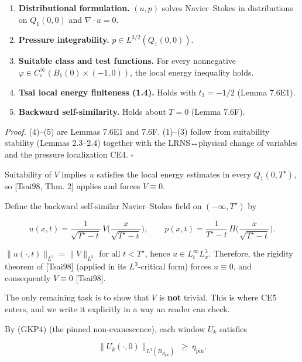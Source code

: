 \documentclass[
  11pt,
]{article}
\providecommand{\tightlist}{%
  \setlength{\itemsep}{0pt}\setlength{\parskip}{0pt}}
\begin{document}
\begin{enumerate}
\def\labelenumi{\arabic{enumi}.}
\tightlist
\item
  \textbf{Distributional formulation.} \((u,p)\) solves Navier--Stokes in distributions on \(Q_1(0,0)\) and \(\nabla\cdot u=0\).
\item
  \textbf{Pressure integrability.} \(p\in L^{3/2}(Q_1(0,0))\).
\item
  \textbf{Suitable class and test functions.} For every nonnegative \(\varphi\in C_c^\infty(B_1(0)\times(-1,0))\), the local energy inequality holds.
\item
  \textbf{Tsai local energy finiteness (1.4).} Holds with \(t_3=-1/2\) (Lemma 7.6E1).
\item
  \textbf{Backward self-similarity.} Holds about \(T=0\) (Lemma 7.6F).
\end{enumerate}

\emph{Proof.} (4)--(5) are Lemmas 7.6E1 and 7.6F. (1)--(3) follow from suitability stability (Lemmas 2.3--2.4) together with the LRNS↔physical change of variables and the pressure localization CE4. \(\square\)

Suitability of \(V\) implies \(u\) satisfies the local energy estimates in every \(Q_1(0,T^\star)\), so {[}Tsai98, Thm. 2{]} applies and forces \(V\equiv 0\).

Define the backward self-similar Navier--Stokes field on \((-\infty,T^\star)\) by

\begin{equation}
u(x,t)=\frac{1}{\sqrt{T^\star-t}}\,V\!\Big(\frac{x}{\sqrt{T^\star-t}}\Big),\qquad
p(x,t)=\frac{1}{T^\star-t}\,\Pi\!\Big(\frac{x}{\sqrt{T^\star-t}}\Big).
\tag{7.35}\label{eq:7_35_selfsimilar_from_V}
\end{equation}

\(\|u(\cdot,t)\|_{L^3}=\|V\|_{L^3}\) for all \(t<T^\star\), hence \(u\in L_t^\infty L_x^3\). Therefore, the rigidity theorem of {[}Tsai98{]} (applied in its \(L^3\)-critical form) forces \(u\equiv 0\), and consequently \(V\equiv 0\) {[}Tsai98{]}.

The only remaining task is to show that \(V\) is \textbf{not} trivial. This is where CE5 enters, and we write it explicitly in a way an reader can check.

By (GKP4) (the pinned non-evanescence), each window \(U_k\) satisfies

\begin{equation}
\|U_k(\cdot,0)\|_{L^3(B_{R_{\mathrm{pin}}})}\ \ge\ \eta_{\mathrm{pin}}.
\tag{7.36}
\end{equation}
\end{document}
